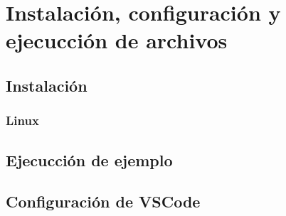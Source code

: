 \chapter{Instalación, configuración y ejecucción de archivos}

\section{Instalación}

\subsection{Linux}

\section{Ejecucción de ejemplo}


\section{Configuración de VSCode}